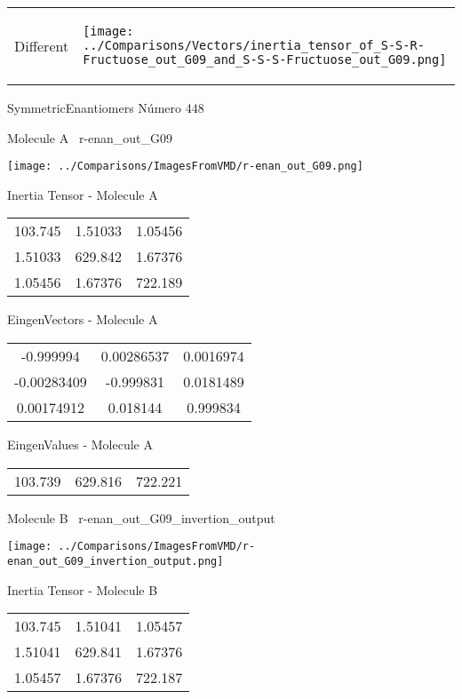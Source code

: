 \vtab[-5mm]
\begin{tabular}{*{2}{m{}}}
\begin{center}
\textcolor{NavyBlue}{\Large Different}
\end{center}
&
\begin{center}
\texttt{[image: ../Comparisons/Vectors/inertia\_tensor\_of\_S-S-R-Fructuose\_out\_G09\_and\_S-S-S-Fructuose\_out\_G09.png]}
\end{center}
\end{tabular}

 \newpage

\vtab[-3cm]
\begin{center}
{\large SymmetricEnantiomers \tab Número 448}
\end{center}
\begin{multicols}{2}
\begin{center}

Molecule A \
r-enan\_out\_G09

\texttt{[image: ../Comparisons/ImagesFromVMD/r-enan\_out\_G09.png]}

Inertia Tensor - Molecule A \\
\begin{tabular}{|c c c|}
103.745	 & 	1.51033	 & 	1.05456	 \\
1.51033	 & 	629.842	 & 	1.67376	 \\
1.05456	 & 	1.67376	 & 	722.189
\end{tabular}

\vtab
 EingenVectors - Molecule A     \\
\begin{tabular}{|c c c|}
-0.999994	 & 	0.00286537	 & 	0.0016974	 \\
-0.00283409	 & 	-0.999831	 & 	0.0181489	 \\
0.00174912	 & 	0.018144	 & 	0.999834
\end{tabular}

\vtab
 EingenValues - Molecule A     \\
\begin{tabular}{|c c c|}
103.739	 & 	629.816	 & 	722.221	 \\
\end{tabular}
\columnbreak

Molecule B \
r-enan\_out\_G09\_invertion\_output

\texttt{[image: ../Comparisons/ImagesFromVMD/r-enan\_out\_G09\_invertion\_output.png]}

Inertia Tensor - Molecule B \\
\begin{tabular}{|c c c|}
103.745	 & 	1.51041	 & 	1.05457	 \\
1.51041	 & 	629.841	 & 	1.67376	 \\
1.05457	 & 	1.67376	 & 	722.187
\end{tabular}


\end{center}
\end{multicols}

